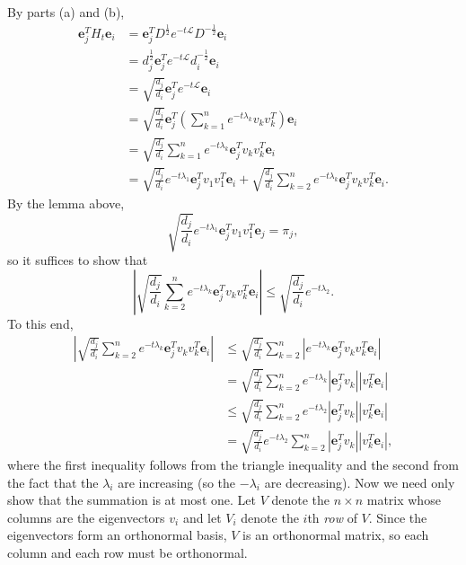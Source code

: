 \documentclass{article}
\newcommand{\1}{\mathbf{1}}
\newcommand{\0}{\mathbf{0}}
\newcommand{\e}{\mathbf{e}}
\renewcommand{\L}{\mathcal{L}}
\begin{document}
\begin{enumerate}
\begin{enumerate}
    By parts (a) and (b),
    \begin{align*}
      \e_j^T H_t \e_i &= \e_j^T D^{\frac{1}{2}} e^{-t \L} D^{-\frac{1}{2}} \e_i \\
      & = d_j^{\frac{1}{2}} \e_j^T e^{-t \L} d_i^{-\frac{1}{2}} \e_i \\
      & = \sqrt{\frac{d_j}{d_i}} \e_j^T e^{-t \L} \e_i \\
      & = \sqrt{\frac{d_j}{d_i}} \e_j^T (\sum_{k = 1}^n e^{-t \lambda_k} v_k v_k^T) \e_i \\
      & = \sqrt{\frac{d_j}{d_i}} \sum_{k = 1}^n e^{-t \lambda_k} \e_j^T v_k v_k^T \e_i \\
       & = \sqrt{\frac{d_j}{d_i}} e^{-t \lambda_1} \e_j^T v_1 v_1^T \e_i + \sqrt{\frac{d_j}{d_i}} \sum_{k = 2}^n e^{-t \lambda_k} \e_j^T v_k v_k^T \e_i.
    \end{align*}
    By the lemma above,
    \begin{equation*}
      \sqrt{\frac{d_j}{d_i}} e^{-t \lambda_1} \e_j^T v_1 v_1^T \e_j = \pi_j,
    \end{equation*}
    so it suffices to show that
    \begin{equation*}
      \left|\sqrt{\frac{d_j}{d_i}} \sum_{k = 2}^n e^{-t \lambda_k} \e_j^T v_k v_k^T \e_i\right| \leq \sqrt{\frac{d_j}{d_i}} e^{-t \lambda_2}.
    \end{equation*}
    To this end,
    \begin{align*}
      \left|\sqrt{\frac{d_j}{d_i}} \sum_{k = 2}^n e^{-t \lambda_k} \e_j^T v_k v_k^T \e_i\right| & \leq \sqrt{\frac{d_j}{d_i}} \sum_{k = 2}^n \left|e^{-t \lambda_k} \e_j^T v_k v_k^T \e_i\right| \\
      & = \sqrt{\frac{d_j}{d_i}} \sum_{k = 2}^n e^{-t \lambda_k} \left|\e_j^T v_k\right| \left|v_k^T \e_i\right| \\
      & \leq \sqrt{\frac{d_j}{d_i}} \sum_{k = 2}^n e^{-t \lambda_2} \left|\e_j^T v_k\right| \left|v_k^T \e_i\right| \\
      & = \sqrt{\frac{d_j}{d_i}} e^{-t \lambda_2} \sum_{k = 2}^n \left|\e_j^T v_k\right| \left|v_k^T \e_i\right|,
    \end{align*}
    where the first inequality follows from the triangle inequality and the second from the fact that the $\lambda_i$ are increasing (so the $-\lambda_i$ are decreasing).
    Now we need only show that the summation is at most one.
    Let $V$ denote the $n \times n$ matrix whose columns are the eigenvectors $v_i$ and let $V_i$ denote the $i$th \emph{row} of $V$.
    Since the eigenvectors form an orthonormal basis, $V$ is an orthonormal matrix, so each column and each row must be orthonormal.

\end{enumerate}
\end{enumerate}
\end{document}
